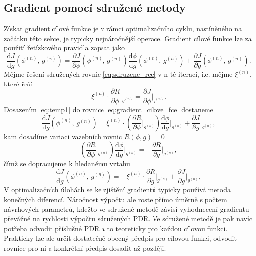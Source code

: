 \subsection{Gradient pomocí sdružené metody}
Získat gradient cílové funkce je v rámci optimalizačního cyklu, nastíněného na začátku této sekce, je typicky nejnáročnější operace. Gradient cílové funkce lze za použití řetízkového pravidla zapsat jako
\begin{equation}\label{eq:gradient_cilove_fce}
\dfrac
{\mathrm{d}J}
{\mathrm{d}g} (\phi^{(n)}, \, g^{(n)})
=
\dfrac
{\partial J}
{\partial \phi }(\phi^{(n)}, \, g^{(n)})
\dfrac
{\mathrm{d}\phi}
{\mathrm{d}g}(\phi^{(n)}, \, g^{(n)})
+
\dfrac
{\partial J}
{\partial g}(\phi^{(n)}, \, g^{(n)}).
\end{equation}
Mějme řešení sdružených rovnic \ref{eq:sdruzene_rce} v n-té iteraci, i.e. mějme $ \xi^{(n)} $, které řeší
\begin{equation}\label{eq:temp1}
\xi^{(n)} \cdot \dfrac{\partial R}{\partial \phi} \Bigr|_{g^{(n)}}=\dfrac{\partial J}{\partial \phi}\Bigr|_{g^{(n)}}.
\end{equation}
Dosazením \ref{eq:temp1} do rovnice \ref{eq:gradient_cilove_fce} dostaneme 
\begin{equation*}
\dfrac{\mathrm{d}J}
{\mathrm{d}g} (\phi^{(n)}, \, g^{(n)})
=
\xi^{(n)} 
\cdot 
\left(
\dfrac{\partial R}
{\partial \phi}\Bigr|_{g^{(n)}}
\right)
\dfrac{\mathrm{d}\phi}
{\mathrm{d}g}\Bigr|_{g^{(n)}}
+
\dfrac{\partial J}
{\partial g}\Bigr|_{g^{(n)}},
\end{equation*}
kam dosadíme variaci vazebních rovnic $ R(\phi,g)=0 $
\begin{equation*}
\left(
\dfrac{\partial R}
{\partial \phi}\Bigr|_{g^{(n)}}
\right)
\dfrac{\mathrm{d}\phi}
{\mathrm{d}g}\Bigr|_{g^{(n)}}
=
-\dfrac{\partial R}
{\partial g}\Bigr|_{g^{(n)}},
\end{equation*}
čímž se dopracujeme k hledanému vztahu
\begin{equation*}
\dfrac{\mathrm{d}J}
{\mathrm{d}g} (\phi^{(n)}, \, g^{(n)})
=
-\xi^{(n)} 
\cdot 
\dfrac{\partial R}
{\partial g}\Bigr|_{g^{(n)}}
+
\dfrac{\partial J}
{\partial g}\Bigr|_{g^{(n)}},
\end{equation*}
V optimalizačních úlohách se ke zjištění gradientů typicky používá metoda konečných diferencí. Náročnost výpočtu ale roste přímo úměrně s počtem návrhových parametrů, kdežto ve sdružené metodě závisí vyhodnocení gradientu převážně na rychlosti výpočtu sdružených PDR. Ve sdružené metodě je pak navíc potřeba odvodit příslušné PDR a to teoreticky pro každou cílovou funkci. Prakticky lze ale určit dostatečně obecný předpis pro cílovou funkci, odvodit rovnice pro ni a konkrétní předpis dosadit až později.

